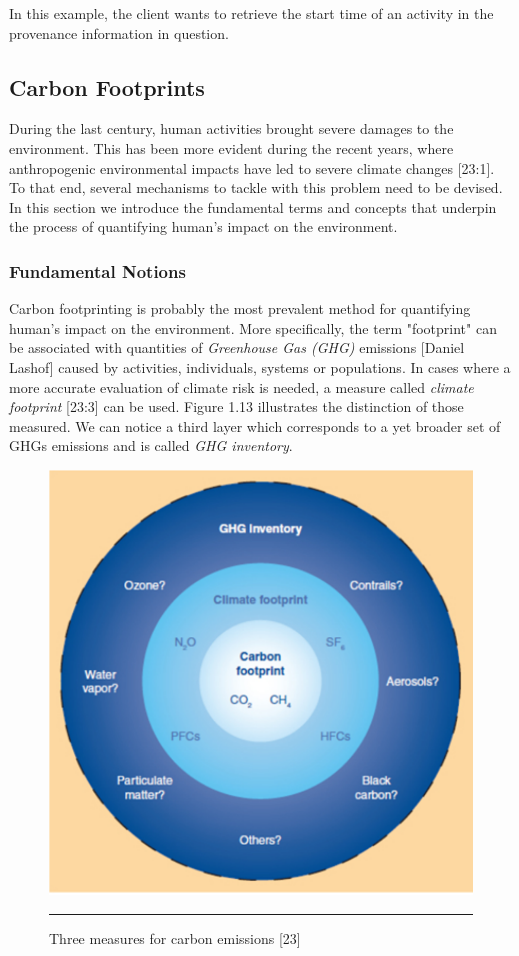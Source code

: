 In this example, the client wants to retrieve the start time of an activity in the provenance information in question.

\subsection{Carbon Footprints}

During the last century, human activities brought severe damages to the environment. This has been more evident during the recent years, where anthropogenic environmental impacts have led to severe climate changes [23:1]. To that end, several mechanisms to tackle with this problem need to be devised. In this section we introduce the fundamental terms and concepts that underpin the process of quantifying human's impact on the environment.

\subsubsection{Fundamental Notions}

Carbon footprinting is probably the most prevalent method for quantifying human's impact on the environment. More specifically, the term "footprint" can be associated with quantities of \emph{Greenhouse Gas (GHG)} emissions [Daniel Lashof] caused by activities, individuals, systems or populations. In cases where a more accurate evaluation of climate risk is needed, a measure called \emph{climate footprint} [23:3] can be used. Figure 1.13 illustrates the distinction of those measured. We can notice a third layer which corresponds to a yet broader set of GHGs emissions and is called \emph{GHG inventory}.

\begin{figure}[htbp]
	\centering
		\includegraphics{./Figures/figure16.pdf}
		\rule{35em}{0.5pt}
	\caption[Carbon Emissions Measures]{Three measures for carbon emissions [23]}
	\label{fig:ghgEmissionMeasures}
\end{figure}

